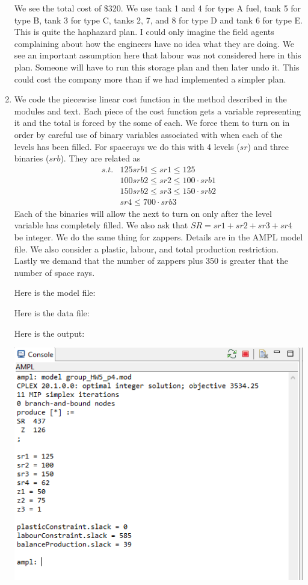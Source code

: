 \documentclass[11pt]{article}
\begin{document}
\begin{enumerate}
We see the total cost of \$320.  We use tank 1 and 4 for type A fuel, tank 5 for type B, tank 3 for type C, tanks 2, 7, and 8 for type D and tank 6 for type E.  This is quite the haphazard plan.  I could only imagine the field agents complaining about how the engineers have no idea what they are doing.  We see an important assumption here that labour was not considered here in this plan.    Someone will have to run this storage plan and then later undo it.  This could cost the company more than if we had implemented a simpler plan.
\item We code the piecewise linear cost function in the method described in the modules and text.  Each piece of the cost function gets a variable representing it and the total is forced by the some of each.  We force them to turn on in order by careful use of binary variables associated with when each of the levels has been filled.  For spacerays we do this with 4 levels ($sr$) and three binaries ($srb$).  They are related as
\begin{equation}
\begin{array}{cl}
s.t. & 125srb1\leq sr1\leq 125\\
& 100 srb2\leq sr2\leq 100\cdot srb1\\
&150 srb2\leq sr3 \leq 150\cdot srb2\\
& sr4\leq 700\cdot srb3
\end{array}
\end{equation}
Each of the binaries will allow the next to turn on only after the level variable has completely filled.
We also ask that $SR = sr1+ sr2 +sr3 +sr4$ be integer.  We do the same thing for zappers.  Details are in the AMPL model file.  We also consider a plastic, labour, and total production restriction.  Lastly we demand that the number of zappers plus 350 is greater that the number of space rays.

Here is the model file:

{\tiny {}}

Here is the data file:

{\tiny {}}

Here is the output:


\includegraphics[width = .9\textwidth]{outputp4.png}


\end{enumerate}
\end{document}
